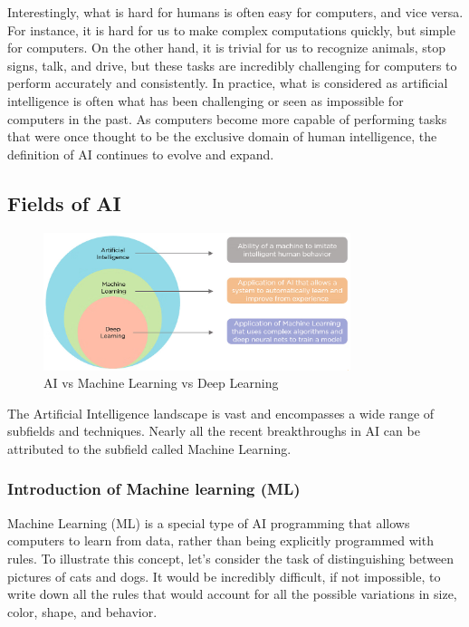 \documentclass{article}
\begin{document}
Interestingly, what is hard for humans is often easy for computers, and vice
versa. For instance, it is hard for us to make complex computations quickly,
but simple for computers. On the other hand, it is trivial for us to recognize
animals, stop signs, talk, and drive, but these tasks are incredibly
challenging for computers to perform accurately and consistently. In practice,
what is considered as artificial intelligence is often what has been
challenging or seen as impossible for computers in the past. As computers
become more capable of performing tasks that were once thought to be the
exclusive domain of human intelligence, the definition of AI continues
to evolve and expand.

\subsection{Fields of AI}

\begin{figure} %
    \centering
    \includegraphics[width=0.8\textwidth]{images/AI_ML_DL.png}
    \caption{AI vs Machine Learning vs Deep Learning}
\end{figure}



The Artificial Intelligence landscape is vast and encompasses a wide range
of subfields and techniques. Nearly all the recent breakthroughs in AI
can be attributed to the subfield called Machine Learning.

\subsubsection{Introduction of Machine learning (ML)}

Machine Learning (ML) is a special type of AI programming that allows
computers to learn from data, rather than being explicitly programmed
with rules. To illustrate this concept, let's consider the task of
distinguishing between pictures of cats and dogs. It would be incredibly
difficult, if not impossible, to write down all the rules that would
account for all the possible variations in size, color, shape, and
behavior.
\end{document}

